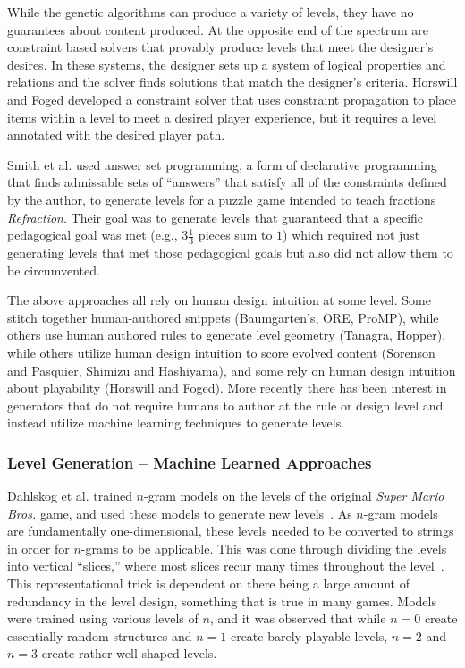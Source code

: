 \documentclass[12pt]{report}
\begin{document}
While the genetic algorithms can produce a variety of levels, they have no guarantees about content produced. At the opposite end of the spectrum are constraint based solvers that provably produce levels that meet the designer's desires. In these systems, the designer sets up a system of logical properties and relations and the solver finds solutions that match the designer's criteria.
Horswill and Foged \cite{HORSWILLCONSTRAINT} developed a constraint solver that uses constraint propagation to place items within a level to meet a desired player experience, but it requires a level annotated with the desired player path. 

Smith et al. \cite{refraction} used answer set programming, a form of declarative programming that finds admissable sets of ``answers'' that satisfy all of the constraints defined by the author, to generate levels for a puzzle game intended to teach fractions \textit{Refraction}.  Their goal was to generate levels that guaranteed that a specific pedagogical goal was met (e.g., $3 \frac{1}{3}$ pieces sum to $1$) which required not just generating levels that met those pedagogical goals but also did not allow them to be circumvented.

The above approaches all rely on human design intuition at some level.  Some stitch together human-authored snippets (Baumgarten's, ORE, ProMP), while others use human authored rules to generate level geometry (Tanagra, Hopper), while others  utilize human design intuition to score evolved content (Sorenson and Pasquier, Shimizu and Hashiyama), and some rely on human design intuition about playability (Horswill and Foged).  More recently there has been interest in generators that do not require humans to author at the rule or design level and instead utilize machine learning techniques to generate levels.
\subsubsection*{Level Generation -- Machine Learned Approaches}

Dahlskog et al. trained $n$-gram models on the levels of the original \textit{Super Mario Bros.} game, and used these models to generate new levels~\cite{dahlskog2014linear}. As $n$-gram models are fundamentally one-dimensional, these levels needed to be converted to strings in order for $n$-grams to be applicable. This was done through dividing the levels into vertical ``slices,'' where most slices recur many times throughout the level~\cite{dahlskog2013patterns}. This representational trick is dependent on there being a large amount of redundancy in the level design, something that is true in many games. Models were trained using various levels of $n$, and it was observed that while $n=0$ create essentially random structures and $n=1$ create barely playable levels, $n=2$ and $n=3$ create rather well-shaped levels.
\end{document}
